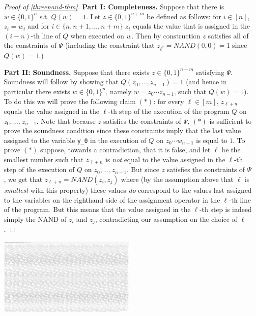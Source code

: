 \begin{proof}[Proof of \cref{threenand-thm}]
\textbf{Part I: Completeness.} Suppose that there is \(w\in \{0,1\}^n\)
s.t. \(Q(w)=1\). Let \(z\in \{0,1\}^{n+m}\) be defined as follows: for
\(i\in [n]\), \(z_i=w_i\) and for \(i\in \{n,n+1,\ldots,n+m\}\) \(z_i\)
equals the value that is assigned in the \((i-n)\)-th line of \(Q\) when
executed on \(w\). Then by construction \(z\) satisfies all of the
constraints of \(\Psi\) (including the constraint that
\(z_{\ell^*}=\ensuremath{\mathit{NAND}}(0,0)=1\) since \(Q(w)=1\).)

\textbf{Part II: Soundness.} Suppose that there exists
\(z\in \{0,1\}^{n+m}\) satisfying \(\Psi\). Soundness will follow by
showing that \(Q(z_0,\ldots,z_{n-1})=1\) (and hence in particular there
exists \(w\in \{0,1\}^n\), namely \(w=z_0\cdots z_{n-1}\), such that
\(Q(w)=1\)). To do this we will prove the following claim \((*)\): for
every \(\ell \in [m]\), \(z_{\ell+n}\) equals the value assigned in the
\(\ell\)-th step of the execution of the program \(Q\) on
\(z_0,\ldots,z_{n-1}\). Note that because \(z\) satisfies the
constraints of \(\Psi\), \((*)\) is sufficient to prove the soundness
condition since these constraints imply that the last value assigned to
the variable \texttt{y\_0} in the execution of \(Q\) on
\(z_0\cdots w_{n-1}\) is equal to \(1\). To prove \((*)\) suppose,
towards a contradiction, that it is false, and let \(\ell\) be the
smallest number such that \(z_{\ell+n}\) is \emph{not} equal to the
value assigned in the \(\ell\)-th step of the execution of \(Q\) on
\(z_0,\ldots,z_{n-1}\). But since \(z\) satisfies the constraints of
\(\Psi\), we get that \(z_{\ell+n}=\ensuremath{\mathit{NAND}}(z_i,z_j)\)
where (by the assumption above that \(\ell\) is \emph{smallest} with
this property) these values \emph{do} correspond to the values last
assigned to the variables on the righthand side of the assignment
operator in the \(\ell\)-th line of the program. But this means that the
value assigned in the \(\ell\)-th step is indeed simply the NAND of
\(z_i\) and \(z_j\), contradicting our assumption on the choice of
\(\ell\).

\end{proof}


\begin{marginfigure}
\centering
\includegraphics[width=\linewidth, height=1.5in, keepaspectratio]{../figure/threenandresultreduction.png}
\caption{A \(3\ensuremath{\mathit{NAND}}\) instance that is obtained by
taking a NAND-TM program for computing the \(\ensuremath{\mathit{AND}}\)
function, unrolling it to obtain a \(\ensuremath{\mathit{NANDSAT}}\)
instance, and then composing it with the reduction of
\cref{threenand-thm}.}
\label{resultreduction}
\end{marginfigure}

